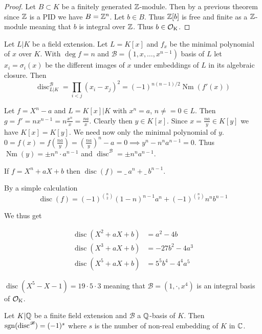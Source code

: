 \documentclass[12pt, a4paper]{article}
\newcommand{\BB}{\mathscr{B}}
\DeclareMathOperator{\Nm}{Nm}
\DeclareMathOperator{\disc}{disc}
\begin{document}
\begin{proof}
	Let $B \subset K$ be a finitely generated 
	$\mathbb{Z}$-module. Then by a previous theorem 
	since $\mathbb{Z}$ is a PID we have $B = \mathbb{Z}^n$.
	Let $b \in B$. Thus $\mathbb{Z}[b]$ is free and finite as a
	$\mathbb{Z}$-module meaning that
	$b$ is integral over $\mathbb{Z}$.
	Thus $b \in \operatorname{\mathcal{O}_K}$.
\end{proof}

\begin{prop}{}{}
	Let $L\vert K$ be a field extension. 
	Let $L = K[x]$ and $f_x$ be the minimal 
	polynomial of $x$ over $K$. With $\deg f = n$
	and $\BB = (1,x, \dots, x^{n-1})$ basis of 
	$L$ let $x_i = \sigma_i(x)$ be the different 
	images of $x$ under embeddings of $L$ in 
	its algebraic closure. Then 
	$$\disc_{L \vert K }^\BB = \prod_{i < j} 
	(x_i-x_j)^2 = (-1)^{n(n-1)/2} \Nm(f'(x))$$
\end{prop}

\begin{ex}{}{}
		Let $f = X^n - a$ and $L = K[x] \vert K$
		with $x^n=a$, $n \neq = 0 \in L$.
		Then $g = f' = n x^{n-1} =  n\frac{x^n}{x} 
		= \frac{na}{x}$. Clearly then $y \in 
		K[x]$. Since $x = \frac{na}{y} \in K[y]$
		we have $K[x] = K[y]$.
		We need now only the minimal polynomial 
		of $y$. $0 = f(x) = f(\frac{na}{y}) = 
		(\frac{na}{y})^n - a = 0 \implies y^n - n^n a^{n-1} = 0$.
		Thus $\Nm(y) = \pm n^n \cdot a^{n-1}$ and $\disc^\BB = \pm n^n a^{n-1}$. 
\end{ex}

\begin{cor}{}{}
	If $f = X^n + aX + b$ then $\disc(f) = \_\ a^n + \_\ b^{n-1}$.
\end{cor}

	By a simple calculation  
	$$\boxed{\disc(f) = (-1)^{{n \choose 2}}(1-n)^{n-1} a^n + (-1)^{n \choose 
	2}n^nb^{n-1}}$$

	We thus get 

	\begin{align*}
		\disc(X^2 + aX + b) &= a^2-4b \\
		\disc(X^3 + aX + b) &= -27b^2-4a^3 \\
		\disc(X^5 + aX + b) &= 5^5b^4-4^4a^5
	\end{align*}

	\begin{ex}
		$\disc(X^5-X-1) = 19 \cdot 5 \cdot 3$ meaning that $\BB = (1, \cdot, x^4)$
		 is an integral basis of $\operatorname{\mathcal{O}_K}$.
	\end{ex}

	\begin{prop}{}{}
		Let $K\vert \mathbb{Q}$ be a finite field extension and $\BB$ a 
		$\mathbb{Q}$-basis of $K$. Then $\sgn(\disc^\BB) = (-1)^s$ where 
		$s$ is the number of non-real embedding of $K$ in $\mathbb{C}$.
	\end{prop}
\end{document}
